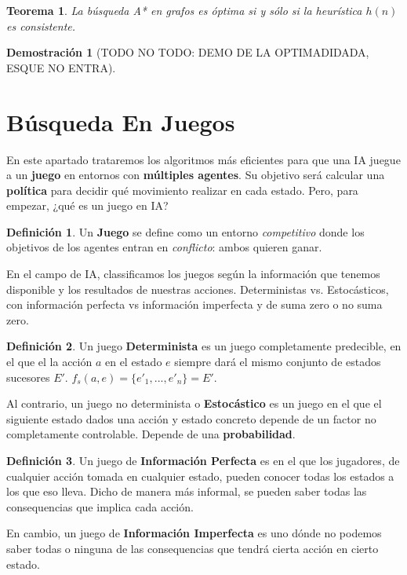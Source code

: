 \documentclass[12pt,a4paper,catalan, leqno]{article} %
\theoremstyle{definition}
\newtheorem{defn}{Definición}[section]
\newtheorem*{tm}{Teorema}
\newtheorem*{demo}{Demostración}
\begin{document}
\begin{tm}
\textit{La búsqueda A* en grafos es óptima si y sólo si la heurística $h(n)$ es consistente.}

\begin{demo}
[TODO NO TODO: DEMO DE LA OPTIMADIDADA, ESQUE NO ENTRA]
\end{demo}
\end{tm}

\pagebreak
\section{Búsqueda En Juegos}

En este apartado trataremos los algoritmos más eficientes para que una IA juegue a un \textbf{juego} en entornos con \textbf{múltiples agentes}. Su objetivo será calcular una \textbf{política} para decidir qué movimiento realizar en cada estado. Pero, para empezar, ¿qué es un juego en IA?

\begin{defn}
Un \textbf{Juego} se define como un entorno \textit{competitivo} donde los objetivos de los agentes entran en \textit{conflicto}: ambos quieren ganar.
\end{defn}

En el campo de IA, classificamos los juegos según la información que tenemos disponible y los resultados de nuestras acciones. Deterministas vs. Estocásticos, con información perfecta vs información imperfecta y de suma zero o no suma zero.

\begin{defn}
Un juego \textbf{Determinista} es un juego completamente predecible, en el que el la acción $a$ en el estado $e$ siempre dará el mismo conjunto de estados sucesores $E'$. $f_s(a,e) = \{e'_1,...,e'_n\} = E'$.

Al contrario, un juego no determinista o \textbf{Estocástico} es un juego en el que el siguiente estado dados una acción y estado concreto depende de un factor no completamente controlable. Depende de una \textbf{probabilidad}.
\end{defn}

\begin{defn}
Un juego de \textbf{Información Perfecta} es en el que los jugadores, de cualquier acción tomada en cualquier estado, pueden conocer todas los estados a los que eso lleva. Dicho de manera más informal, se pueden saber todas las consequencias que implica cada acción.

En cambio, un juego de \textbf{Información Imperfecta} es uno dónde no podemos saber todas o ninguna de las consequencias que tendrá cierta acción en cierto estado.
\end{defn}
\end{document}
